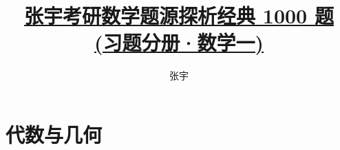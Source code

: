 \documentclass[openany,twocolumn]{ctexbook}
\title{\href{https://github.com/sikouhjw/zhangyu1000}{张宇考研数学题源探析经典 1000 题\\(习题分册·数学一)}}
\author{张宇}
\theoremstyle{change}
\begin{document}
	
	\section{代数与几何}
\end{document}
